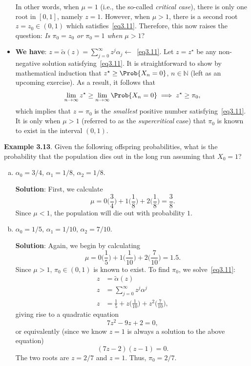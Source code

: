 \begin{itemize}
\begin{figure}[!htbp]
          \end{figure}

          In other words, when $ \mu=1 $ (i.e., the so-called \emph{critical case}), there is only one root in $ [0,1] $,
          namely $ z=1 $. However, when $ \mu>1 $, there is a second root $ z=z_0\in(0,1) $ which satisfies~\ref{eq3.11}. Therefore,
          this now raises the question: \emph{Is $ \pi_0=z_0 $ or $ \pi_0=1 $ when $ \mu>1 $}?
    \item \textbf{We have}: $ z=\tilde{\alpha}(z)=\sum_{j=0}^{\infty} z^j\alpha_j\leftarrow $~\ref{eq3.11}. Let $ z=z^\star $ be any non-negative
          solution satisfying~\ref{eq3.11}. It is straightforward to show by mathematical induction that $ z^\star\ge \Prob{X_n=0} $, $ n\in\mathbb{N} $
          (left as an upcoming exercise). As a result, it follows that
          \[ \lim\limits_{{n} \to {\infty}} z^\star \ge \lim\limits_{{n} \to {\infty}} \Prob{X_n=0}\implies z^\star\ge \pi_0, \]
          which implies that $ z=\pi_0 $ is the \emph{smallest} positive number satisfying~\ref{eq3.11}. It is only when $ \mu>1 $
          (referred to as the \emph{supercritical} case) that $ \pi_0 $ is known to exist in the interval $ (0,1) $.
\end{itemize}
\begin{Example}
    \textbf{Example 3.13}. Given the following offspring probabilities, what is the probability that the
    population dies out in the long run assuming that $ X_0=1 $?
    \begin{enumerate}[(a)]
        \item $ \alpha_0=3/4 $, $ \alpha_1=1/8 $, $ \alpha_2=1/8 $.

              \textbf{Solution}: First, we calculate
              \[ \mu=0\biggl(\frac{3}{4}\biggr)+1\biggl(\frac{1}{8}\biggr)+2\biggl(\frac{1}{8}\biggr)=\frac{3}{8}.  \]
              Since $ \mu<1 $, the population will die out with probability $ 1 $.
        \item $ \alpha_0=1/5 $, $ \alpha_1=1/10 $, $ \alpha_2=7/10 $.

              \textbf{Solution}: Again, we begin by calculating
              \[ \mu=0\biggl(\frac{1}{5}\biggr)+1\biggl(\frac{1}{10}\biggr)+2\biggl(\frac{7}{10}\biggr)=1.5. \]
              Since $ \mu>1 $, $ \pi_0\in(0,1) $ is known to exist. To find $ \pi_0 $, we solve~\ref{eq3.11}:
              \begin{align*}
                  z & =\tilde{\alpha}(z)                                                       \\
                  z & =\sum_{j=0}^{\infty} z^j \alpha^j                                        \\
                  z & =\frac{1}{5} +z\biggl(\frac{1}{10}\biggr)+z^2\biggl(\frac{7}{10}\biggr),
              \end{align*}
              giving rise to a quadratic equation
              \[ 7z^2-9z+2=0, \]
              or equivalently (since we know $ z=1 $ is always a solution to the above equation)
              \[ (7z-2)(z-1)=0. \]
              The two roots are $ z=2/7 $ and $ z=1 $. Thus, $ \pi_0=2/7 $.
    \end{enumerate}
\end{Example}
